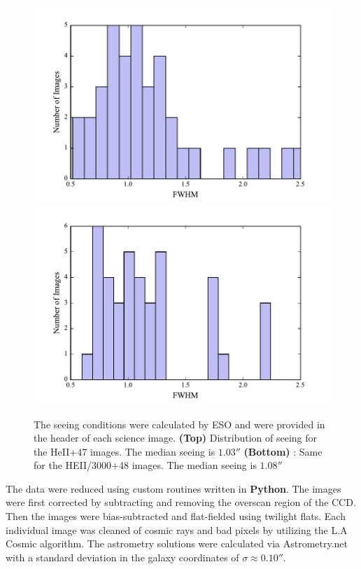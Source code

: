 \documentclass[twocolumn]{aastex6}
\begin{document}
\begin{figure}[h]
\centering
\includegraphics[scale=.55]{avg_seeing_HEII.pdf}
\includegraphics[scale=.55]{avg_seeing_HEII3000.pdf}
\caption{ The seeing conditions were calculated by ESO and were provided in the header of each science image. \textbf{(Top)} Distribution of seeing for the HeII+47 images. The median seeing is $1.03''$ \textbf{(Bottom)} : Same for the HEII/3000+48 images. The median seeing is $1.08''$ }
\end{figure}


The data were reduced using custom routines written in \textbf{Python}. The images were first corrected by subtracting and removing the overscan region of the CCD. Then the images were bias-subtracted and flat-fielded using twilight flats. Each individual image was cleaned of cosmic rays and bad pixels by utilizing the L.A Cosmic algorithm. The astrometry solutions were calculated via Astrometry.net \citep{Lang} with a standard deviation in the galaxy coordinates of $\sigma \approx 0.10''$. 
\end{document}
